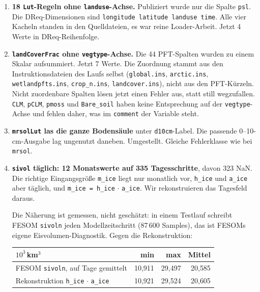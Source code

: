 \documentclass[11pt,a4paper]{article}
\newcommand{\code}[1]{\texttt{\small #1}}
\begin{document}
\begin{enumerate}
\item \textbf{18 \code{*Lut}-Regeln ohne \code{landuse}-Achse.} Publiziert wurde nur
die Spalte \code{psl}. Die DReq-Dimensionen sind
\code{longitude latitude landuse time}. Alle vier Kacheln standen in den
Quelldateien, es war reine Loader-Arbeit. Jetzt 4 Werte in DReq-Reihenfolge.

\item \textbf{\code{landCoverFrac} ohne \code{vegtype}-Achse.} Die 44 PFT-Spalten
wurden zu einem Skalar aufsummiert. Jetzt 7 Werte. Die Zuordnung stammt aus den
Instruktionsdateien des Laufs selbst (\code{global.ins}, \code{arctic.ins},
\code{wetlandpfts.ins}, \code{crop\_n.ins}, \code{landcover.ins}), nicht aus den
PFT-K\"urzeln. Nicht zuordenbare Spalten l\"osen jetzt einen Fehler aus, statt still
wegzufallen. \code{CLM}, \code{pCLM}, \code{pmoss} und \code{Bare\_soil} haben keine
Entsprechung auf der \code{vegtype}-Achse und fehlen daher, was im
\code{comment} der Variable steht.

\item \textbf{\code{mrsolLut} las die ganze Bodens\"aule} unter \code{d10cm}-Label.
Die passende 0--10-cm-Ausgabe lag ungenutzt daneben. Umgestellt. Gleiche Fehlerklasse
wie bei \code{mrsol}.

\item \textbf{\code{sivol} t\"aglich: 12 Monatswerte auf 335 Tagesschritte},
davon 323 NaN. Die richtige Eingangsgr\"o\ss e \code{m\_ice} liegt nur monatlich vor,
\code{h\_ice} und \code{a\_ice} aber t\"aglich, und \code{m\_ice = h\_ice} $\cdot$
\code{a\_ice}. Wir rekonstruieren das Tagesfeld daraus.

Die N\"aherung ist gemessen, nicht gesch\"atzt: in einem Testlauf schreibt FESOM
\code{sivoln} jeden Modellzeitschritt (87\,600 Samples), das ist FESOMs eigene
Eisvolumen-Diagnostik. Gegen die Rekonstruktion:

\begin{center}
\begin{tabular}{lrrr}
\toprule
$10^3$\,km$^3$ & min & max & Mittel \\
\midrule
FESOM \code{sivoln}, auf Tage gemittelt & 10{,}911 & 29{,}497 & 20{,}585 \\
Rekonstruktion \code{h\_ice} $\cdot$ \code{a\_ice} & 10{,}921 & 29{,}524 & 20{,}605 \\
\bottomrule
\end{tabular}
\end{center}


\end{enumerate}
\end{document}
